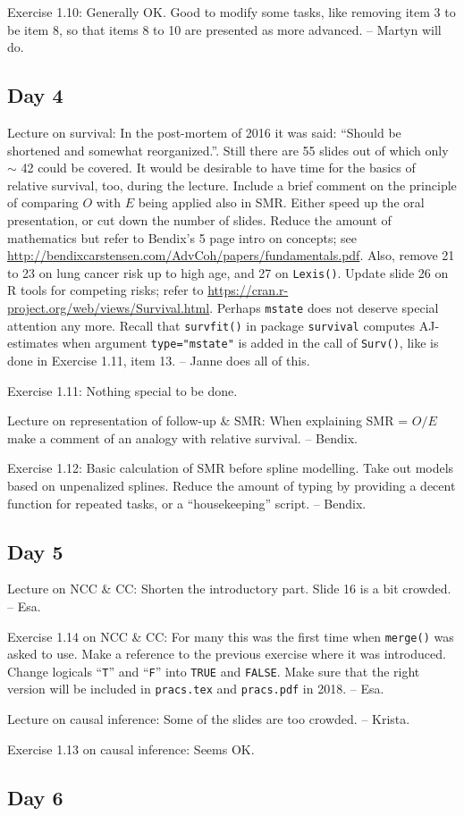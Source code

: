 \documentclass[11pt,a4]{article}
\begin{document}
Exercise 1.10: Generally OK. Good to modify some tasks, like removing item 3 to be item 8, so that items 8 to 10 are presented as more advanced. -- Martyn will do.

\subsection*{Day 4}

Lecture on survival: In the post-mortem of 2016 it was said: 
``Should be shortened and somewhat reorganized.''. 
Still there are 55 slides out of which only $\sim$ 42 could be covered. 
It would be desirable to have time for the basics of relative survival, too,
during the lecture. Include a brief comment on the principle of
comparing $O$ with $E$ being applied also in SMR.
Either speed up the oral presentation, or cut down the number of slides.
Reduce the amount of mathematics but refer to Bendix's 5 page intro
on concepts; see \url{http://bendixcarstensen.com/AdvCoh/papers/fundamentals.pdf}.
Also, remove 21 to 23 on lung cancer risk up to high age, and 27 on {\tt Lexis()}.
Update slide 26 on R tools for competing risks; refer
to \url{https://cran.r-project.org/web/views/Survival.html}.
 Perhaps {\tt mstate} does not deserve special attention any more.
Recall that {\tt survfit()} 
in package {\tt survival} computes AJ-estimates when argument {\tt type="mstate"}
is added in the call of {\tt Surv()}, like is done in Exercise 1.11, item 13.
-- Janne does all of this.

Exercise 1.11: Nothing special to be done. 

Lecture on representation of follow-up \& SMR: When explaining SMR = $O/E$
 make a comment
of an analogy with relative survival. -- Bendix. 

Exercise 1.12: Basic calculation of SMR before spline modelling.
Take out models based on unpenalized splines.
 Reduce the amount of typing by providing a decent function
for repeated tasks, or a ``housekeeping'' script. -- Bendix.  

\subsection*{Day 5}

Lecture on NCC \& CC: Shorten the introductory part. Slide 16 is a bit crowded. -- Esa. 

Exercise 1.14 on NCC \& CC: 
For many this was the first time when {\tt merge()} was asked to use. Make a reference to the previous exercise
where it was introduced.
Change logicals ``{\tt T}'' and ``{\tt F}'' into
{\tt TRUE} and {\tt FALSE}. 
Make sure that the right version will be included in {\tt pracs.tex} and {\tt pracs.pdf} in 2018. -- Esa.

Lecture on causal inference: Some of the slides are too crowded. -- Krista.

Exercise 1.13 on causal inference: Seems OK.

\subsection*{Day 6}
\end{document}
